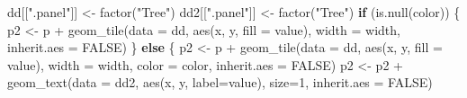 \documentclass[
]{book}
\newenvironment{Shaded}{\begin{snugshade}}{\end{snugshade}}
\newcommand{\AttributeTok}[1]{\textcolor[rgb]{0.77,0.63,0.00}{#1}}
\newcommand{\ConstantTok}[1]{\textcolor[rgb]{0.00,0.00,0.00}{#1}}
\newcommand{\ControlFlowTok}[1]{\textcolor[rgb]{0.13,0.29,0.53}{\textbf{#1}}}
\newcommand{\DecValTok}[1]{\textcolor[rgb]{0.00,0.00,0.81}{#1}}
\newcommand{\FunctionTok}[1]{\textcolor[rgb]{0.00,0.00,0.00}{#1}}
\newcommand{\NormalTok}[1]{#1}
\newcommand{\OtherTok}[1]{\textcolor[rgb]{0.56,0.35,0.01}{#1}}
\newcommand{\SpecialCharTok}[1]{\textcolor[rgb]{0.00,0.00,0.00}{#1}}
\newcommand{\StringTok}[1]{\textcolor[rgb]{0.31,0.60,0.02}{#1}}
\begin{document}
\begin{Shaded}
\begin{Highlighting}[]
\NormalTok{  dd[[}\StringTok{".panel"}\NormalTok{]] }\OtherTok{\textless{}{-}} \FunctionTok{factor}\NormalTok{(}\StringTok{"Tree"}\NormalTok{)}
\NormalTok{  dd2[[}\StringTok{".panel"}\NormalTok{]] }\OtherTok{\textless{}{-}} \FunctionTok{factor}\NormalTok{(}\StringTok{"Tree"}\NormalTok{)}
  \ControlFlowTok{if}\NormalTok{ (}\FunctionTok{is.null}\NormalTok{(color)) \{}
\NormalTok{    p2 }\OtherTok{\textless{}{-}}\NormalTok{ p }\SpecialCharTok{+} \FunctionTok{geom\_tile}\NormalTok{(}\AttributeTok{data =}\NormalTok{ dd, }\FunctionTok{aes}\NormalTok{(x, y, }\AttributeTok{fill =}\NormalTok{ value),}
                        \AttributeTok{width =}\NormalTok{ width, }\AttributeTok{inherit.aes =} \ConstantTok{FALSE}\NormalTok{)}
\NormalTok{  \}}
  \ControlFlowTok{else}\NormalTok{ \{}
\NormalTok{    p2 }\OtherTok{\textless{}{-}}\NormalTok{ p }\SpecialCharTok{+} \FunctionTok{geom\_tile}\NormalTok{(}\AttributeTok{data =}\NormalTok{ dd, }\FunctionTok{aes}\NormalTok{(x, y, }\AttributeTok{fill =}\NormalTok{ value),}
                        \AttributeTok{width =}\NormalTok{ width, }\AttributeTok{color =}\NormalTok{ color, }\AttributeTok{inherit.aes =} \ConstantTok{FALSE}\NormalTok{)}
\NormalTok{    p2 }\OtherTok{\textless{}{-}}\NormalTok{ p2 }\SpecialCharTok{+} \FunctionTok{geom\_text}\NormalTok{(}\AttributeTok{data =}\NormalTok{ dd2, }\FunctionTok{aes}\NormalTok{(x, y, }\AttributeTok{label=}\NormalTok{value), }\AttributeTok{size=}\DecValTok{1}\NormalTok{, }\AttributeTok{inherit.aes =} \ConstantTok{FALSE}\NormalTok{)}
    

\end{Highlighting}
\end{Shaded}
\end{document}
